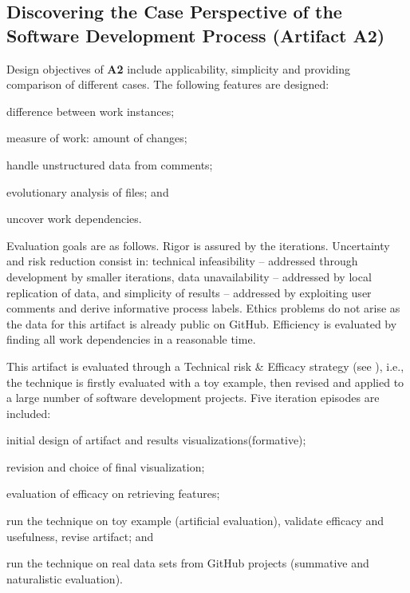 \subsection{Discovering the Case Perspective of the Software Development Process (Artifact A2)} 
Design objectives of \textbf{A2} include applicability, simplicity and providing comparison of different cases. The following features are designed: 
\begin{iiilist}
	\item difference between work instances;
	\item measure of work: amount of changes;
	\item handle unstructured data from comments;
	\item evolutionary analysis of files; and
	\item uncover work dependencies.
\end{iiilist}
Evaluation goals are as follows. Rigor is assured by the iterations. Uncertainty and risk reduction consist in: technical infeasibility -- addressed through development by smaller iterations, data unavailability -- addressed by local replication of data, and simplicity of results -- addressed by exploiting user comments and derive informative process labels. Ethics problems do not arise as the data for this artifact is already public on GitHub. Efficiency is evaluated by finding all work dependencies in a reasonable time. 

This artifact is evaluated through a Technical risk \& Efficacy strategy (see \cite{Venable2016}), i.e., the technique is firstly evaluated with a toy example, then revised and applied to a large number of software development projects. Five iteration episodes are included: 
\begin{iiilist}
	\item initial design of artifact and results  visualizations(formative);
	\item revision and choice of final visualization;
	\item evaluation of efficacy on retrieving features;
	\item run the technique on toy example (artificial evaluation), validate efficacy and usefulness, revise artifact; and
	\item run the technique on real data sets from GitHub projects (summative and naturalistic evaluation).
\end{iiilist}




